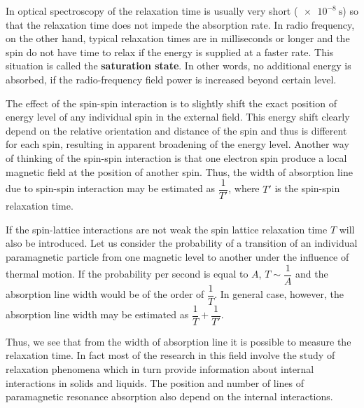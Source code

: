 \documentclass[%
 reprint,
nofootinbib,
 amsmath,amssymb,
 aps,
floatfix,
]{revtex4-2}
\begin{document}
    \par
    In optical spectroscopy of the relaxation time is usually very short ($\SI{e-8}{\second}$) so that the relaxation time does not impede the absorption rate. In radio frequency, on the other hand, typical relaxation times are in milliseconds or longer and the spin do not have time to relax if the energy is supplied at a faster rate. This situation is called the \textbf{saturation state}. In other words, no additional energy is absorbed, if the radio-frequency field power is increased beyond certain level.
    \par
    The effect of the spin-spin interaction is to slightly shift the exact position of energy level of any individual spin in the external field. This energy shift clearly depend on the relative orientation and distance of the spin and thus is different for each spin, resulting in apparent broadening of the energy level. Another way of thinking of the spin-spin interaction is that one electron spin produce a local magnetic field at the position of another spin. Thus, the width of absorption line due to spin-spin interaction may be estimated as $\dfrac{1}{T'}$, where $T'$ is the spin-spin relaxation time.
    \par
    If the spin-lattice interactions are not weak the spin lattice relaxation time $T$ will also be introduced. Let us consider the probability of a transition of an individual paramagnetic particle from one magnetic level to another under the influence of thermal motion. If the probability per second is equal to $A$, $T \sim \dfrac{1}{A}$ and the absorption line width would be of the order of $\dfrac{1}{T}$. In general case, however, the absorption line width may be estimated as $\dfrac{1}{T} + \dfrac{1}{T'}$.
    \par
    Thus, we see that from the width of absorption line it is possible to measure the relaxation time. In fact most of the research in this field involve the study of relaxation phenomena which in turn provide information about internal interactions in solids and liquids. The position and number of lines of paramagnetic resonance absorption also depend on the internal interactions.
    
    
\end{document}
